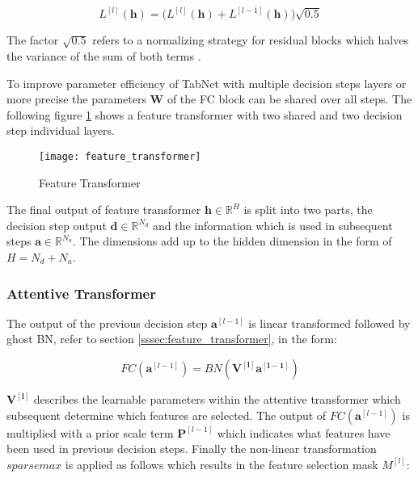 \documentclass[../main.tex]{subfiles}
\begin{document}
\begin{equation}
    L^{[l]}(\mathbf{h}) = \Big( L^{[l]}(\mathbf{h}) + L^{[l-1]}(\mathbf{h}) \Big ) \sqrt{0.5}
\end{equation}

The factor $\sqrt{0.5}$ refers to a normalizing strategy for residual blocks which halves the variance of the sum of both terms \cite{gehring_convolutional_2017}. 

To improve parameter efficiency of TabNet with multiple decision steps layers or more precise the parameters $\mathbf{W}$ of the FC block can be shared over all steps. The following figure \ref{fig:feature_transformer} shows a feature transformer with two shared and two decision step individual layers.

\begin{figure}[H]
    \centering
    \texttt{[image: feature\_transformer]}    
    \caption{Feature Transformer \cite{arik_tabnet_2020}}
    \label{fig:feature_transformer}
\end{figure}

The final output of feature transformer $\mathbf{h} \in \mathbb{R}^{H}$ is split into two parts, the decision step output $\mathbf{d} \in \mathbb{R}^{N_d}$ and the information which is used in subsequent steps $\mathbf{a} \in \mathbb{R}^{N_a}$. The dimensions add up to the hidden dimension in the form of $H=N_d + N_a$.

\subsubsection{Attentive Transformer} \label{sssec:attentive_transformer}

The output of the previous decision step $\mathbf{a}^{[l-1]}$ is linear transformed followed by ghost BN, refer to section \ref{sssec:feature_transformer}, in the form:

\begin{equation}
    FC(\mathbf{a}^{[l-1]})=BN(\mathbf{V^{[l]}\mathbf{a}^{[l-1]}})
\end{equation}

$\mathbf{V^{[l]}}$ describes the learnable parameters within the attentive transformer which subsequent determine which features are selected. The output of $FC(\mathbf{a}^{[l-1]})$ is multiplied with a prior scale term $\mathbf{P}^{[l-1]}$ which indicates what features have been used in previous decision steps. Finally the non-linear transformation $sparsemax$ is applied as follows which results in the feature selection mask $M^{[l]}$:
\end{document}
